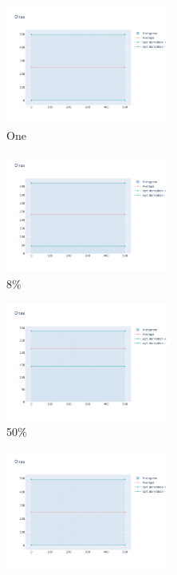 \documentclass[12pt, fleqn]{report}                             %
\theoremstyle{break}                                            %
\begin{document}
      \begin{figure}[ht!]
        \centering
        \begin{subfigure}[b]{0.4\linewidth}
          \includegraphics[width=0.6\textwidth]{Images/5/dia-a.png}
          \caption{One}
        \end{subfigure}
        \begin{subfigure}[b]{0.4\linewidth}
          \includegraphics[width=0.6\textwidth]{Images/5/dia-b.png}
          \caption{8\%}
        \end{subfigure}
        \begin{subfigure}[b]{0.4\linewidth}
          \includegraphics[width=0.6\textwidth]{Images/5/dia-c.png}
          \caption{50\%}
        \end{subfigure}
        \begin{subfigure}[b]{0.4\linewidth}
          \includegraphics[width=0.6\textwidth]{Images/5/dia-d.png}

\end{subfigure}
\end{figure}
\end{document}
